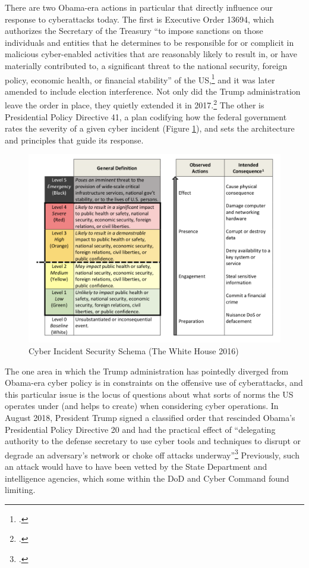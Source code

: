 \documentclass[12pt]{article}
\begin{document}
There are two Obama-era actions in particular that directly influence our response to cyberattacks today. The first is Executive Order 13694, which authorizes the Secretary of the Treasury ``to impose sanctions on those individuals and entities that he determines to be responsible for or complicit in malicious cyber-enabled activities that are reasonably likely to result in, or have materially contributed to, a significant threat to the national security, foreign policy, economic health, or financial stability'' of the US,\footcite{daniel_our_2015} and it was later amended to include election interference. Not only did the Trump administration leave the order in place, they quietly extended it in 2017.\footcite{uchill_white_2017} The other is Presidential Policy Directive 41, a plan codifying how the federal government rates the severity of a given cyber incident (Figure \ref{severity-schema}), and sets the architecture and principles that guide its response.

\begin{figure}
\centering 
\includegraphics[scale=0.53]{severity-schema.png}
\caption{Cyber Incident Security Schema (The White House 2016)}
\label{severity-schema}
\end{figure}

The one area in which the Trump administration has pointedly diverged from Obama-era cyber policy is in constraints on the offensive use of cyberattacks, and this particular issue is the locus of questions about what sorts of norms the US operates under (and helps to create) when considering cyber operations. In August 2018, President Trump signed a classified order that rescinded Obama's Presidential Policy Directive 20 and had the practical effect of ``delegating authority to the defense secretary to use cyber tools and techniques to disrupt or degrade an adversary's network or choke off attacks underway''\footcite{nakashima_trump_2018} Previously, such an attack would have to have been vetted by the State Department and intelligence agencies, which some within the DoD and Cyber Command found limiting. 
\end{document}
